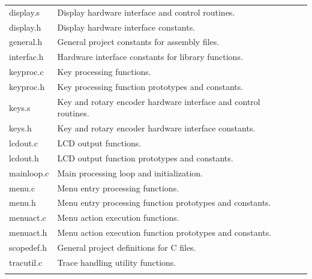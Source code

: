 \documentclass[titlepage]{scrartcl}
\begin{document}
\begin{appendices}
	\begin{table}[b!]
	  \begin{center}
	\setcounter{codepage}{\thepage}
	\addtocounter{codepage}{1}
    		\begin{tabular}{p{3cm} p{10cm} p{1cm}}
		 display.s & Display hardware interface and control routines. & \thecodepage \\ \addtocounter{codepage}{4}
		 display.h & Display hardware interface constants. & \thecodepage \\ \addtocounter{codepage}{1}
		 general.h & General project constants for assembly files. & \thecodepage \\ \addtocounter{codepage}{1}
		 interfac.h & Hardware interface constants for library functions. & \thecodepage \\ \addtocounter{codepage}{1}
		 keyproc.c & Key processing functions. & \thecodepage \\ \addtocounter{codepage}{5}
		 keyproc.h & Key processing function prototypes and constants. & \thecodepage \\ \addtocounter{codepage}{1}
		 keys.s & Key and rotary encoder hardware interface and control routines. & \thecodepage \\ \addtocounter{codepage}{5}
		 keys.h & Key and rotary encoder hardware interface constants. & \thecodepage \\ \addtocounter{codepage}{1}
		 lcdout.c & LCD output functions. & \thecodepage \\ \addtocounter{codepage}{6}
		 lcdout.h & LCD output function prototypes and constants. & \thecodepage \\ \addtocounter{codepage}{1}
		 mainloop.c & Main processing loop and initialization. & \thecodepage \\ \addtocounter{codepage}{4}
		 menu.c & Menu entry processing functions. & \thecodepage \\ \addtocounter{codepage}{10}
		 menu.h & Menu entry processing function prototypes and constants. & \thecodepage \\ \addtocounter{codepage}{2}
		 menuact.c & Menu action execution functions. & \thecodepage \\ \addtocounter{codepage}{23}
		 menuact.h & Menu action execution function prototypes and constants. & \thecodepage \\ \addtocounter{codepage}{2}
		 scopedef.h & General project definitions for C files. & \thecodepage \\ \addtocounter{codepage}{2}
		 tracutil.c & Trace handling utility functions. & \thecodepage \\ \addtocounter{codepage}{15}

\end{tabular}
\end{center}
\end{table}
\end{appendices}
\end{document}
